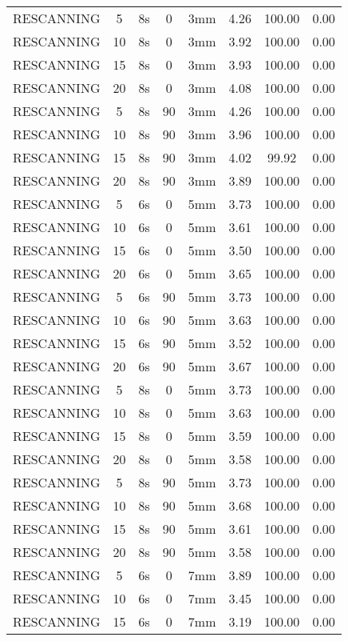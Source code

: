 \begin{table}[H]
\begin{tabular}{|c|c||c|c|c||c|c|c|}
RESCANNING & 5 & 8s & 0 & 3mm & 4.26 & 100.00 & 0.00 \\
RESCANNING & 10 & 8s & 0 & 3mm & 3.92 & 100.00 & 0.00 \\
RESCANNING & 15 & 8s & 0 & 3mm & 3.93 & 100.00 & 0.00 \\
RESCANNING & 20 & 8s & 0 & 3mm & 4.08 & 100.00 & 0.00 \\
RESCANNING & 5 & 8s & 90 & 3mm & 4.26 & 100.00 & 0.00 \\
RESCANNING & 10 & 8s & 90 & 3mm & 3.96 & 100.00 & 0.00 \\
RESCANNING & 15 & 8s & 90 & 3mm & 4.02 & 99.92 & 0.00 \\
RESCANNING & 20 & 8s & 90 & 3mm & 3.89 & 100.00 & 0.00 \\
RESCANNING & 5 & 6s & 0 & 5mm & 3.73 & 100.00 & 0.00 \\
RESCANNING & 10 & 6s & 0 & 5mm & 3.61 & 100.00 & 0.00 \\
RESCANNING & 15 & 6s & 0 & 5mm & 3.50 & 100.00 & 0.00 \\
RESCANNING & 20 & 6s & 0 & 5mm & 3.65 & 100.00 & 0.00 \\
RESCANNING & 5 & 6s & 90 & 5mm & 3.73 & 100.00 & 0.00 \\
RESCANNING & 10 & 6s & 90 & 5mm & 3.63 & 100.00 & 0.00 \\
RESCANNING & 15 & 6s & 90 & 5mm & 3.52 & 100.00 & 0.00 \\
RESCANNING & 20 & 6s & 90 & 5mm & 3.67 & 100.00 & 0.00 \\
RESCANNING & 5 & 8s & 0 & 5mm & 3.73 & 100.00 & 0.00 \\
RESCANNING & 10 & 8s & 0 & 5mm & 3.63 & 100.00 & 0.00 \\
RESCANNING & 15 & 8s & 0 & 5mm & 3.59 & 100.00 & 0.00 \\
RESCANNING & 20 & 8s & 0 & 5mm & 3.58 & 100.00 & 0.00 \\
RESCANNING & 5 & 8s & 90 & 5mm & 3.73 & 100.00 & 0.00 \\
RESCANNING & 10 & 8s & 90 & 5mm & 3.68 & 100.00 & 0.00 \\
RESCANNING & 15 & 8s & 90 & 5mm & 3.61 & 100.00 & 0.00 \\
RESCANNING & 20 & 8s & 90 & 5mm & 3.58 & 100.00 & 0.00 \\
RESCANNING & 5 & 6s & 0 & 7mm & 3.89 & 100.00 & 0.00 \\
RESCANNING & 10 & 6s & 0 & 7mm & 3.45 & 100.00 & 0.00 \\
RESCANNING & 15 & 6s & 0 & 7mm & 3.19 & 100.00 & 0.00 \\

\end{tabular}
\end{table}
